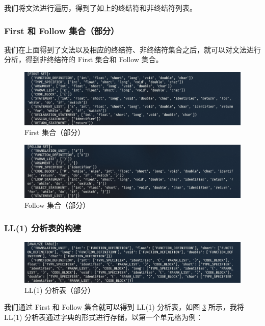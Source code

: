 \documentclass[UTF8]{ctexart}
\begin{document}
我们将文法进行遍历，得到了如上的终结符和非终结符列表。

\subsubsection{First 和 Follow 集合（部分）}

我们在上面得到了文法以及相应的终结符、非终结符集合之后，就可以对文法进行分析，得到非终结符的 First 集合和 Follow 集合。

\begin{figure}[H]
  \includegraphics[width=\linewidth]{images/first.png}
  \caption{First 集合（部分）}
  \label{fig:figure4-1}
\end{figure}

\begin{figure}[H]
  \includegraphics[width=\linewidth]{images/follow.png}
  \caption{Follow 集合（部分）}
  \label{fig:figure4-2}
\end{figure}

\subsubsection{LL(1) 分析表的构建}
\begin{figure}[H]
  \includegraphics[width=\linewidth]{images/ll1_table.png}
  \caption{LL(1) 分析表（部分）}
  \label{fig:figure5}
\end{figure}

我们通过 First 和 Follow 集合就可以得到 LL(1) 分析表，如图 \ref{fig:figure5} 所示，我将 LL(1) 分析表通过字典的形式进行存储，以第一个单元格为例：
\end{document}
